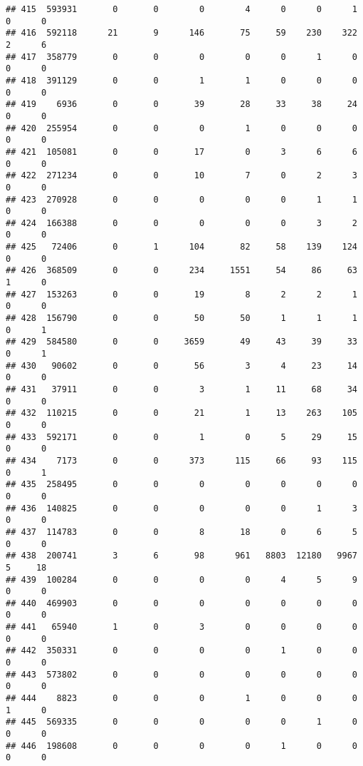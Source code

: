 \documentclass[
]{article}
\begin{document}
\begin{verbatim}
## 415  593931       0       0        0        4      0      0      1     0      0
## 416  592118      21       9      146       75     59    230    322     2      6
## 417  358779       0       0        0        0      0      1      0     0      0
## 418  391129       0       0        1        1      0      0      0     0      0
## 419    6936       0       0       39       28     33     38     24     0      0
## 420  255954       0       0        0        1      0      0      0     0      0
## 421  105081       0       0       17        0      3      6      6     0      0
## 422  271234       0       0       10        7      0      2      3     0      0
## 423  270928       0       0        0        0      0      1      1     0      0
## 424  166388       0       0        0        0      0      3      2     0      0
## 425   72406       0       1      104       82     58    139    124     0      0
## 426  368509       0       0      234     1551     54     86     63     1      0
## 427  153263       0       0       19        8      2      2      1     0      0
## 428  156790       0       0       50       50      1      1      1     0      1
## 429  584580       0       0     3659       49     43     39     33     0      1
## 430   90602       0       0       56        3      4     23     14     0      0
## 431   37911       0       0        3        1     11     68     34     0      0
## 432  110215       0       0       21        1     13    263    105     0      0
## 433  592171       0       0        1        0      5     29     15     0      0
## 434    7173       0       0      373      115     66     93    115     0      1
## 435  258495       0       0        0        0      0      0      0     0      0
## 436  140825       0       0        0        0      0      1      3     0      0
## 437  114783       0       0        8       18      0      6      5     0      0
## 438  200741       3       6       98      961   8803  12180   9967     5     18
## 439  100284       0       0        0        0      4      5      9     0      0
## 440  469903       0       0        0        0      0      0      0     0      0
## 441   65940       1       0        3        0      0      0      0     0      0
## 442  350331       0       0        0        0      1      0      0     0      0
## 443  573802       0       0        0        0      0      0      0     0      0
## 444    8823       0       0        0        1      0      0      0     1      0
## 445  569335       0       0        0        0      0      1      0     0      0
## 446  198608       0       0        0        0      1      0      0     0      0

\end{verbatim}
\end{document}
